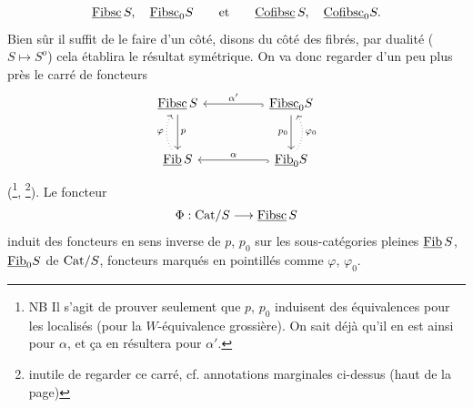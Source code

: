 \[
\underline{\mathrm{Fibsc}}\,S,\quad \underline{\mathrm{Fibsc}}_0S \qquad \text{et} \qquad \underline{\mathrm{Cofibsc}}\,S,\quad \underline{\mathrm{Cofibsc}}_0S.
\]
Bien sûr il suffit de le faire d'un côté, disons du côté des fibrés, par dualité ($S \longmapsto S^o$) cela établira le résultat symétrique. On va donc regarder d'un peu plus près le carré de foncteurs
\[
\begin{tikzcd}[column sep=huge, row sep=large]
\uc{Fibsc}\,S \arrow[d, "p"] & \uc{Fibsc}_0S \arrow[l, hook, "\alpha'"'] \arrow[d, "p_0"'] \\
\uc{Fib}\,S \arrow[u, dotted, bend left, "\varphi"] & \uc{Fib}_0S \arrow[l, hook, "\alpha"'] \arrow[u, dotted, bend right, "\varphi_0"']
\end{tikzcd}
\]
(\footnote[37]{NB Il s'agit de prouver seulement que $p$, $p_0$ induisent des équivalences pour les localisés (pour la $W$-équivalence grossière). On sait déjà qu'il en est ainsi pour $\alpha$, et ça en résultera pour $\alpha'$.}, \footnote[38]{inutile de regarder ce carré, cf. annotations marginales ci-dessus (haut de la page)}). Le foncteur
\[
\Phi : \mathrm{Cat}/S \longrightarrow \underline{\mathrm{Fibsc}}\,S
\]
induit des foncteurs en sens inverse de $p$, $p_0$ sur les sous-catégories pleines $\underline{\mathrm{Fib}}\,S$, $\underline{\mathrm{Fib}}_0S$ de $\mathrm{Cat}/S$, foncteurs marqués en pointillés comme $\varphi$, $\varphi_0$.


